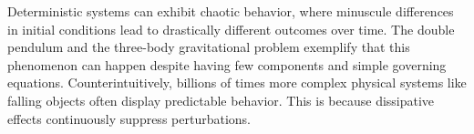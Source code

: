 Deterministic systems can exhibit chaotic behavior, where minuscule differences in initial conditions lead to drastically different outcomes over time. The double pendulum and the three-body gravitational problem exemplify that this phenomenon can happen despite having few components and simple governing equations. Counterintuitively, billions of times more complex physical systems like falling objects often display predictable behavior. This is because dissipative effects continuously suppress perturbations.
